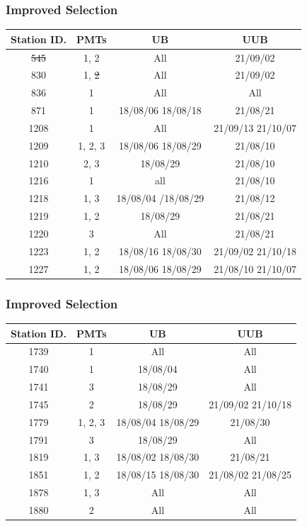 \documentclass[aspectratio=169]{beamer}
\begin{document}
\begin{frame}
  \frametitle{Improved Selection}
  \footnotesize
  \begin{tabular}{c|c|c|c} \hline
    Station ID. & PMTs & UB & UUB \\ \hline
    \sout{545} & 1, 2 & All & 21/09/02 \\ \hline
    830 & 1, \sout{2} & All & 21/09/02 \\ \hline
    836 & 1 & All & All \\ \hline
    871 & 1 & 18/08/06 18/08/18 & 21/08/21 \\ \hline
    1208 & 1 & All & 21/09/13 21/10/07 \\ \hline
    1209 & 1, 2, 3 & 18/08/06 18/08/29 & 21/08/10 \\ \hline
    1210 & 2, 3 & 18/08/29 & 21/08/10 \\ \hline
    1216 & 1 & all & 21/08/10 \\ \hline
    1218 & 1, 3 & 18/08/04 /18/08/29 & 21/08/12 \\ \hline
    1219 & 1, 2 & 18/08/29 & 21/08/21 \\ \hline
    1220 & 3 & All & 21/08/21 \\ \hline
    1223 & 1, 2 & 18/08/16 18/08/30 & 21/09/02 21/10/18 \\ \hline
    1227 & 1, 2 & 18/08/06 18/08/29 & 21/08/10 21/10/07 \\ \hline
  \end{tabular}
\end{frame}


\begin{frame}
  \frametitle{Improved Selection}
  \footnotesize
  \begin{tabular}{c|c|c|c} \hline
    Station ID. & PMTs & UB & UUB \\ \hline
    1739 & 1 & All & All \\ \hline
    1740 & 1 & 18/08/04 & All \\ \hline
    1741 & 3 & 18/08/29 & All \\ \hline
    1745 & 2 & 18/08/29 & 21/09/02 21/10/18 \\ \hline
    1779 & 1, 2, 3 & 18/08/04 18/08/29 & 21/08/30 \\ \hline
    1791 & 3 & 18/08/29 & All \\ \hline
    1819 & 1, 3 & 18/08/02 18/08/30 & 21/08/21 \\ \hline
    1851 & 1, 2 & 18/08/15 18/08/30 & 21/08/02 21/08/25 \\ \hline
    1878 & 1, 3 & All & All \\ \hline
    1880 & 2 & All & All \\ \hline
  \end{tabular}
\end{frame}
\end{document}
